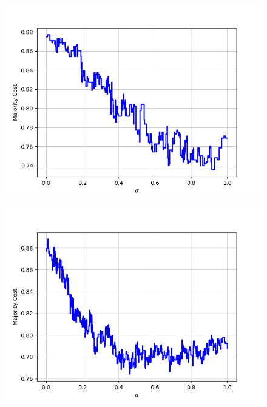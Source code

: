 \begin{figure}[H]
\begin{minipage}{.24\textwidth}
  {\includegraphics[width=\linewidth]{plots/omniglot-intra-ac/Asomtavruli_(Georgian)}}
\end{minipage}
\begin{minipage}{.24\textwidth}
  \centering
  {\includegraphics[width=\linewidth]{plots/omniglot-intra-ac/Balinese}}
\end{minipage}
\begin{minipage}{.24\textwidth}
  \centering

\end{minipage}
\end{figure}
